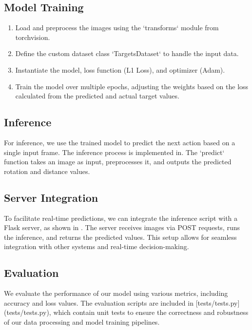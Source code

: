 \documentclass{article}
\begin{document}
\subsection{Model Training}
\begin{enumerate}
    \item Load and preprocess the images using the `transforms` module from torchvision.
    \item Define the custom dataset class `TargetsDataset` to handle the input data.
    \item Instantiate the model, loss function (L1 Loss), and optimizer (Adam).
    \item Train the model over multiple epochs, adjusting the weights based on the loss calculated from the predicted and actual target values.
\end{enumerate}

\subsection{Inference}
For inference, we use the trained model to predict the next action based on a single input frame. The inference process is implemented in. The `predict` function takes an image as input, preprocesses it, and outputs the predicted rotation and distance values.

\subsection{Server Integration}
To facilitate real-time predictions, we can integrate the inference script with a Flask server, as shown in . The server receives images via POST requests, runs the inference, and returns the predicted values. This setup allows for seamless integration with other systems and real-time decision-making.

\subsection{Evaluation}
We evaluate the performance of our model using various metrics, including accuracy and loss values. The evaluation scripts are included in [tests/tests.py](tests/tests.py), which contain unit tests to ensure the correctness and robustness of our data processing and model training pipelines.
\end{document}
